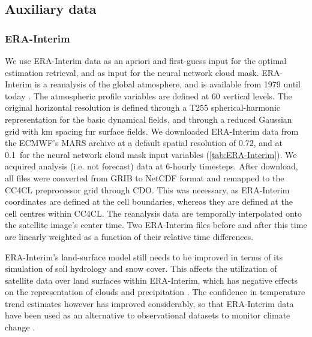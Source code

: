 \subsection{Auxiliary data}

\subsubsection{ERA-Interim}\label{sec:ERA-Interim}

We use ERA-Interim data as an apriori and first-guess input for the optimal estimation retrieval, and as input for the neural network cloud mask. ERA-Interim is a reanalysis of the global atmosphere, and is available from 1979 until today \citep{ERAInterim,Dee11}. The atmospheric profile variables are defined at 60 vertical levels. The original horizontal resolution is defined through a T255 spherical-harmonic representation for the basic dynamical fields, and through a reduced Gaussian grid with  km spacing fur surface fields. We downloaded ERA-Interim data from the ECMWF's MARS archive at a default spatial resolution of 0.72\textdegree, and at 0.1\textdegree\ for the neural network cloud mask input variables (\autoref{tab:ERA-Interim}). We acquired analysis (i.e. not forecast) data at 6-hourly timesteps. After download, all files were converted from GRIB to NetCDF format and remapped to the CC4CL preprocessor grid through CDO. This was necessary, as ERA-Interim coordinates are defined at the cell boundaries, whereas they are defined at the cell centres within CC4CL. The reanalysis data are temporally interpolated onto the satellite image's center time. Two ERA-Interim files before and after this time are linearly weighted as a function of their relative time differences.

ERA-Interim's land-surface model still needs to be improved in terms of its simulation of soil hydrology and snow cover. This affects the utilization of satellite data over land surfaces within ERA-Interim, which has negative effects on the representation of clouds and precipitation \citep{ERAInterim}. The confidence in temperature trend estimates however has improved considerably, so that ERA-Interim data have been used as an alternative to observational datasets to monitor climate change \citep{Willett10}.


